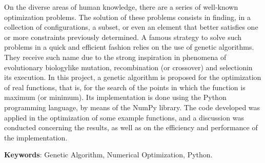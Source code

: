 On the diverse areas of human knowledge, there are a series of well-known optimization
problems. The solution of these problems consists in finding, in a collection of configurations,
a subset, or even an element that better satisfies one or more constraints previously determined. A
famous strategy to solve such problems in a quick and efficient fashion relies on the use of
genetic algorithms. They receive such name due to the strong inspiration in phenomena of
evolutionary biology\trav like mutation, recombination (or crossover) and selection\trav in its execution. 
In this project, a genetic algorithm is proposed for the
optimization of real functions, that is, for the search of the points in which the function is
maximum (or minimum). Its implementation is done using the Python programming language, by means of the NumPy library.
The code developed was applied in the optimization of some example functions, and a discussion
was conducted concerning the results, as well as on the efficiency and performance of the implementation.

\vspace{\onelineskip}\noindent
\textbf{Keywords}: Genetic Algorithm, Numerical Optimization, Python.
